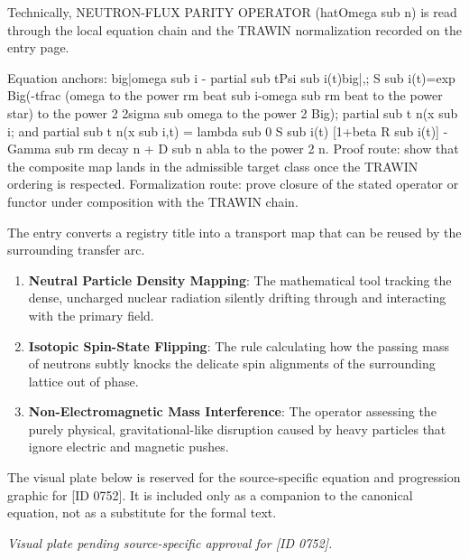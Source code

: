 Technically, NEUTRON-FLUX PARITY OPERATOR (hatOmega sub n) is read through the local equation chain and the TRAWIN normalization recorded on the entry page.

Equation anchors: big|omega sub i - partial sub tPsi sub i(t)big|,; S sub i(t)=exp Big(-tfrac (omega to the power rm beat sub i-omega sub rm beat to the power star) to the power 2 2sigma sub omega to the power 2 Big); partial sub t n(x sub i; and partial sub t n(x sub i,t) = lambda sub 0 S sub i(t) [1+beta R sub i(t)] - Gamma sub rm decay n + D sub n abla to the power 2 n. Proof route: show that the composite map lands in the admissible target class once the TRAWIN ordering is respected. Formalization route: prove closure of the stated operator or functor under composition with the TRAWIN chain.

The entry converts a registry title into a transport map that can be reused by the surrounding transfer arc.
\endgroup

\begin{enumerate}[leftmargin=1.6em,itemsep=6pt,topsep=4pt]
\item \textbf{Neutral Particle Density Mapping}: The mathematical tool tracking the dense, uncharged nuclear radiation silently drifting through and interacting with the primary field.
\item \textbf{Isotopic Spin-State Flipping}: The rule calculating how the passing mass of neutrons subtly knocks the delicate spin alignments of the surrounding lattice out of phase.
\item \textbf{Non-Electromagnetic Mass Interference}: The operator assessing the purely physical, gravitational-like disruption caused by heavy particles that ignore electric and magnetic pushes.
\end{enumerate}

\begingroup\footnotesize\sloppy
The visual plate below is reserved for the source-specific equation and progression graphic for [ID 0752]. It is included only as a companion to the canonical equation, not as a substitute for the formal text.
\par\endgroup
\begingroup\footnotesize\itshape
Visual plate pending source-specific approval for [ID 0752].
\par\endgroup

